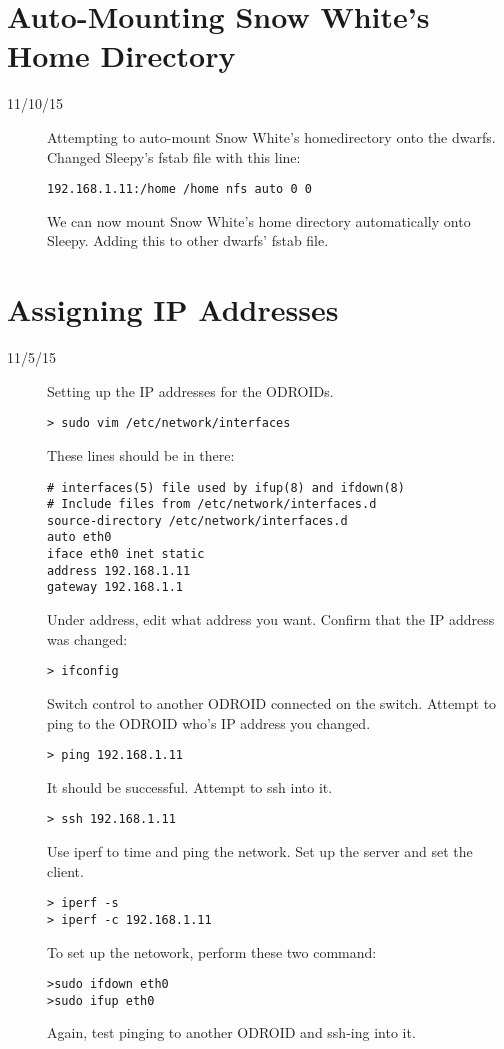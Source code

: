 \section{Auto-Mounting Snow White's Home Directory}
\begin{description}
\item [11/10/15] Attempting to auto-mount Snow White's homedirectory onto the dwarfs. Changed Sleepy's fstab file with this line:

\begin{lstlisting}
192.168.1.11:/home /home nfs auto 0 0
\end{lstlisting}

We can now mount Snow White's home directory automatically onto Sleepy. Adding this to other dwarfs' fstab file.
\end{description}

\section{Assigning IP Addresses}
\begin{description}
\item [11/5/15] Setting up the IP addresses for the ODROIDs. \\
\begin{lstlisting}
> sudo vim /etc/network/interfaces
\end{lstlisting}
These lines should be in there:
\begin{lstlisting}
# interfaces(5) file used by ifup(8) and ifdown(8) 
# Include files from /etc/network/interfaces.d 
source-directory /etc/network/interfaces.d 
auto eth0
iface eth0 inet static
address 192.168.1.11
gateway 192.168.1.1
\end{lstlisting}

Under address, edit what address you want. Confirm that the IP address was changed:
\begin{lstlisting}
> ifconfig
\end{lstlisting}
Switch control to another ODROID connected on the switch. Attempt to ping to the ODROID who's IP address you changed.
\begin{lstlisting}
> ping 192.168.1.11
\end{lstlisting}
It should be successful. Attempt to ssh into it.
\begin{lstlisting}
> ssh 192.168.1.11
\end{lstlisting}
Use iperf to time and ping the network. Set up the server and set the client.
\begin{lstlisting}
> iperf -s
> iperf -c 192.168.1.11
\end{lstlisting}
To set up the netowork, perform these two command:
\begin{lstlisting}
>sudo ifdown eth0
>sudo ifup eth0
\end{lstlisting}
Again, test pinging to another ODROID and ssh-ing into it.
\end{description}

